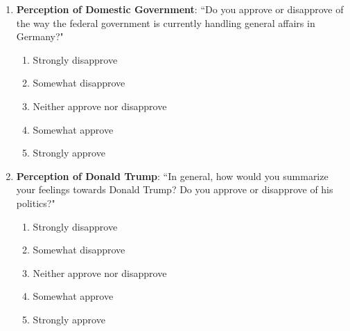 \begin{appendices}
\begin{enumerate}
        \begin{enumerate}
        \item Strongly disagree
        \item Somewhat disagree
        \item Neither agree nor disagree
        \item Somewhat agree
        \item Strongly agree
        \end{enumerate}
    \item \textbf{Perception of Domestic Government}: ``Do you approve or disapprove of the way the federal government is currently handling general affairs in Germany?"
        \begin{enumerate}
            \item Strongly disapprove
            \item Somewhat disapprove
            \item Neither approve nor disapprove
            \item Somewhat approve
            \item Strongly approve
        \end{enumerate}
    \item \textbf{Perception of Donald Trump}: ``In general, how would you summarize your feelings towards Donald Trump? Do you approve or disapprove of his politics?"
        \begin{enumerate}
            \item Strongly disapprove
            \item Somewhat disapprove
            \item Neither approve nor disapprove
            \item Somewhat approve
            \item Strongly approve 
        \end{enumerate}
    \end{enumerate}
    
\end{appendices}